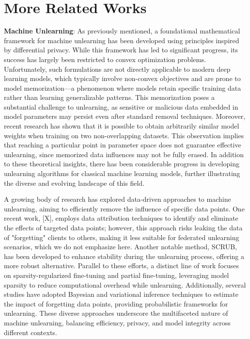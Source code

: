 \documentclass{article}
\newcommand{\todoa}[2][]{\todo[size=tiny,color=blue!20!white,#1]{GA: #2}\xspace}
\begin{document}
\section{More Related Works}
\todoa{combine these two paragraphs}
\textbf{Machine Unlearning}:
As previously mentioned, a foundational mathematical framework for machine unlearning has been developed using principles inspired by differential privacy. While this framework has led to significant progress, its success has largely been restricted to convex optimization problems. Unfortunately, such formulations are not directly applicable to modern deep learning models, which typically involve non-convex objectives and are prone to model memorization—a phenomenon where models retain specific training data rather than learning generalizable patterns. This memorization poses a substantial challenge to unlearning, as sensitive or malicious data embedded in model parameters may persist even after standard removal techniques. Moreover, recent research has shown that it is possible to obtain arbitrarily similar model weights when training on two non-overlapping datasets. This observation implies that reaching a particular point in parameter space does not guarantee effective unlearning, since memorized data influences may not be fully erased. In addition to these theoretical insights, there has been considerable progress in developing unlearning algorithms for classical machine learning models, further illustrating the diverse and evolving landscape of this field.\par

A growing body of research has explored data-driven approaches to machine unlearning, aiming to efficiently remove the influence of specific data points. One recent work, [X]\todoa{???}, employs data attribution techniques to identify and eliminate the effects of targeted data points; however, this approach risks leaking the data of "forgetting" clients to others, making it less suitable for federated unlearning scenarios, which we do not emphasize here. Another notable method, SCRUB, has been developed to enhance stability during the unlearning process, offering a more robust alternative. Parallel to these efforts, a distinct line of work focuses on sparsity-regularized fine-tuning and partial fine-tuning, leveraging model sparsity to reduce computational overhead while unlearning. Additionally, several studies have adopted Bayesian and variational inference techniques to estimate the impact of forgetting data points, providing probabilistic frameworks for unlearning. These diverse approaches underscore the multifaceted nature of machine unlearning, balancing efficiency, privacy, and model integrity across different contexts.\par
\end{document}
